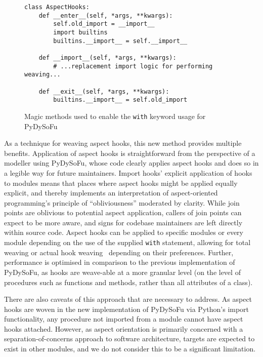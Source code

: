 \begin{figure}[t]
\begin{lstlisting}
class AspectHooks:
    def __enter__(self, *args, **kwargs):
        self.old_import = __import__
        import builtins
        builtins.__import__ = self.__import__

    def __import__(self, *args, **kwargs):
        # ...replacement import logic for performing weaving...

    def __exit__(self, *args, **kwargs):
        builtins.__import__ = self.old_import
\end{lstlisting}
    
    \caption{Magic methods used to enable the \lstinline{with} keyword usage for
    PyDySoFu}
    \label{fig:aspecthooksmagicmethodswith}
\end{figure}


As a technique for weaving aspect hooks, this new method provides multiple
benefits. Application of aspect hooks is straightforward from the perspective of
a modeller using PyDySoFu, whose code clearly applies aspect hooks and does so
in a legible way for future maintainers. Import hooks' explicit application of hooks to modules
means that places where aspect hooks might be applied equally explicit, and thereby implements an
interpretation of aspect-oriented programming's principle of ``obliviousness'' moderated by clarity.
While join points are oblivious to potential aspect application, callers of join points can expect
to be more aware, and signs for codebase maintainers are left directly within source code.
Aspect hooks can be applied to specific modules
or every module depending on the use of the supplied \lstinline{with} statement,
allowing for total weaving or actual hook weaving~\cite{dynamicAOchitchyan}
depending on their preferences. Further, performance is optimised in
comparison to the previous implementation of PyDySoFu, as hooks are weave-able
at a more granular level (on the level of procedures such as functions and
methods, rather than all attributes of a class).

There are also caveats of this approach that are necessary to address.
As aspect hooks are woven in the new implementation of PyDySoFu via Python's
import functionality, any procedure not imported from a module cannot have
aspect hooks attached. However, as
aspect orientation is primarily concerned with a separation-of-concerns approach
to software architecture, targets are expected to exist in other modules, and we
do not consider this to be a significant limitation.

